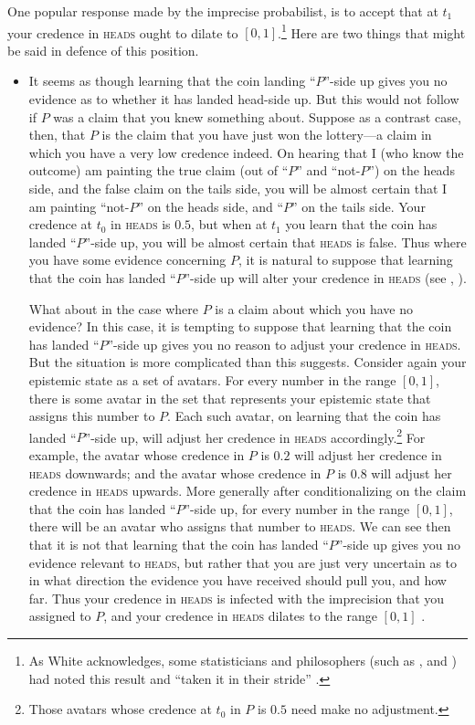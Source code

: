 One popular response made by the imprecise probabilist, is to accept that at $t_1$ your credence in \textsc{heads} ought to dilate to $[0,1]$.\footnote{As White acknowledges, some statisticians and philosophers (such as \citealp{walley1991}, and \citealp{SeidenfeldWasserman1993}) had noted this result and ``taken it in their stride'' \citep[p. 177]{White2009}.} Here are two things that might be said in defence of this position. 

\begin{itemize}
  \item It seems as though learning that the coin landing ``$P$''-side up gives you no evidence as to whether it has landed head-side up. But this would not follow if $P$ was a claim that you knew something about. Suppose as a contrast case, then, that $P$ is the claim that you have just won the lottery---a claim in which you have a very low credence indeed. On hearing that I (who know the outcome) am painting the true claim (out of ``$P$'' and ``not-$P$'') on the heads side, and the false claim on the tails side, you will be almost certain that I am painting ``not-$P$'' on the heads side, and ``$P$'' on the tails side. Your credence at $t_0$ in \textsc{heads} is $0.5$, but when at $t_1$ you learn that the coin has landed ``$P$''-side up, you will be almost certain that \textsc{heads} is false. Thus where you have some evidence concerning $P$, it is natural to suppose that learning that the coin has landed ``$P$''-side up will alter your credence in \textsc{heads} (see \citealp{sturgeon2010}, \citealp{Joyce2010}). 

What about in the case where $P$ is a claim about which you have no evidence? In this case, it is tempting to suppose that learning that the coin has landed ``$P$''-side up gives you no reason to adjust your credence in \textsc{heads}. But the situation is more complicated than this suggests. Consider again your epistemic state as a set of avatars. For every number in the range $[0,1]$, there is some avatar in the set that represents your epistemic state that assigns this number to $P$. Each such avatar, on learning that the coin has landed ``$P$''-side up, will adjust her credence in \textsc{heads} accordingly.\footnote{Those avatars whose credence at $t_0$ in $P$ is $0.5$ need make no adjustment.}  For example, the avatar whose credence in $P$ is $0.2$ will adjust her credence in \textsc{heads} downwards; and the avatar whose credence in $P$ is $0.8$ will adjust her credence in \textsc{heads} upwards. More generally after conditionalizing on the claim that the coin has landed ``$P$''-side up, for every number in the range $[0,1]$, there will be an avatar who assigns that number to \textsc{heads}. We can see then that it is not that learning that the coin has landed ``$P$''-side up gives you no evidence relevant to \textsc{heads}, but rather that you are just very uncertain as to in what direction the evidence you have received should pull you, and how far. Thus your credence in \textsc{heads} is infected with the imprecision that you assigned to $P$, and your credence in \textsc{heads} dilates to the range $[0,1]$ \citep{Joyce2010}.


\end{itemize}
